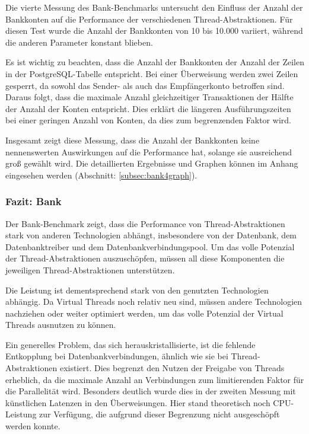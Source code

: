 \documentclass[fontsize=12pt,paper=a4,twoside=semi,parskip=half-,headsepline,headinclude]{scrreprt}
\begin{document}
Die vierte Messung des Bank-Benchmarks untersucht den Einfluss der Anzahl der Bankkonten auf die Performance der verschiedenen Thread-Abstraktionen. Für diesen Test wurde die Anzahl der Bankkonten von 10 bis 10.000 variiert, während die anderen Parameter konstant blieben.

Es ist wichtig zu beachten, dass die Anzahl der Bankkonten der Anzahl der Zeilen in der PostgreSQL-Tabelle entspricht. Bei einer Überweisung werden zwei Zeilen gesperrt, da sowohl das Sender- als auch das Empfängerkonto betroffen sind. Daraus folgt, dass die maximale Anzahl gleichzeitiger Transaktionen der Hälfte der Anzahl der Konten entspricht. Dies erklärt die längeren Ausführungszeiten bei einer geringen Anzahl von Konten, da dies zum begrenzenden Faktor wird.

Insgesamt zeigt diese Messung, dass die Anzahl der Bankkonten keine nennenswerten Auswirkungen auf die Performance hat, solange sie ausreichend groß gewählt wird. Die detaillierten Ergebnisse und Graphen können im Anhang eingesehen werden (Abschnitt: \ref{subsec:bank4graph}).

\subsubsection{Fazit: Bank}

Der Bank-Benchmark zeigt, dass die Performance von Thread-Abstraktionen stark von anderen Technologien abhängt, insbesondere von der Datenbank, dem Datenbanktreiber und dem Datenbankverbindungspool. Um das volle Potenzial der Thread-Abstraktionen auszuschöpfen, müssen all diese Komponenten die jeweiligen Thread-Abstraktionen unterstützen.

Die Leistung ist dementsprechend stark von den genutzten Technologien abhängig. Da Virtual Threads noch relativ neu sind, müssen andere Technologien nachziehen oder weiter optimiert werden, um das volle Potenzial der Virtual Threads ausnutzen zu können.

Ein generelles Problem, das sich herauskristallisierte, ist die fehlende Entkopplung bei Datenbankverbindungen, ähnlich wie sie bei Thread-Abstraktionen existiert. Dies begrenzt den Nutzen der Freigabe von Threads erheblich, da die maximale Anzahl an Verbindungen zum limitierenden Faktor für die Parallelität wird. Besonders deutlich wurde dies in der zweiten Messung mit künstlichen Latenzen in den Überweisungen. Hier stand theoretisch noch CPU-Leistung zur Verfügung, die aufgrund dieser Begrenzung nicht ausgeschöpft werden konnte.
\end{document}
